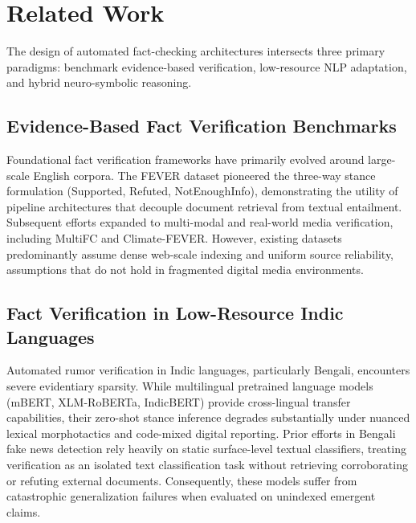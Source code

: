 
\section{Related Work}
\label{sec:related_work}

The design of automated fact-checking architectures intersects three primary paradigms: benchmark evidence-based verification, low-resource NLP adaptation, and hybrid neuro-symbolic reasoning.

\subsection{Evidence-Based Fact Verification Benchmarks}
Foundational fact verification frameworks have primarily evolved around large-scale English corpora. The FEVER dataset pioneered the three-way stance formulation (Supported, Refuted, NotEnoughInfo), demonstrating the utility of pipeline architectures that decouple document retrieval from textual entailment. Subsequent efforts expanded to multi-modal and real-world media verification, including MultiFC and Climate-FEVER. However, existing datasets predominantly assume dense web-scale indexing and uniform source reliability, assumptions that do not hold in fragmented digital media environments.

\subsection{Fact Verification in Low-Resource Indic Languages}
Automated rumor verification in Indic languages, particularly Bengali, encounters severe evidentiary sparsity. While multilingual pretrained language models (mBERT, XLM-RoBERTa, IndicBERT) provide cross-lingual transfer capabilities, their zero-shot stance inference degrades substantially under nuanced lexical morphotactics and code-mixed digital reporting. Prior efforts in Bengali fake news detection rely heavily on static surface-level textual classifiers, treating verification as an isolated text classification task without retrieving corroborating or refuting external documents. Consequently, these models suffer from catastrophic generalization failures when evaluated on unindexed emergent claims.

